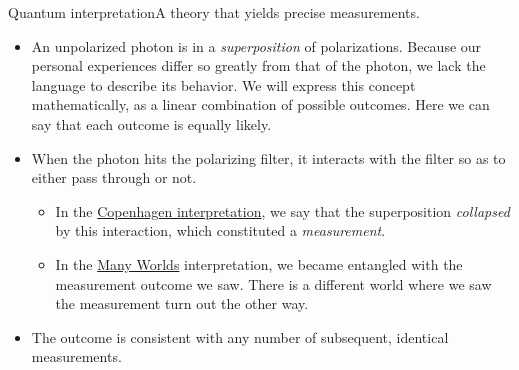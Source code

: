 \begin{frame}{Quantum interpretation}{A theory that yields precise measurements.}
\begin{itemize}
    \item An unpolarized photon is in a \emph{superposition} of polarizations.  Because our personal experiences differ so greatly from that of the photon, we lack the language to describe its behavior.  We will express this concept mathematically, as a linear combination of possible outcomes.  Here we can say that each outcome is equally likely.
    \item When the photon hits the polarizing filter, it interacts with the filter so as to either pass through or not.
    \begin{itemize}
        \item In the \href{https://en.wikipedia.org/wiki/Copenhagen_interpretation}{Copenhagen interpretation}, we say that the superposition \emph{collapsed} by this interaction, which constituted a \emph{measurement}.
        \item In the \href{https://en.wikipedia.org/wiki/Many-worlds_interpretation}{Many Worlds} interpretation, we became entangled with the measurement outcome we saw.  There is a different world where we saw the measurement turn out the other way.
    \end{itemize}
    \item The outcome is consistent with any number of subsequent, identical measurements.
    
\end{itemize}
\end{frame}

